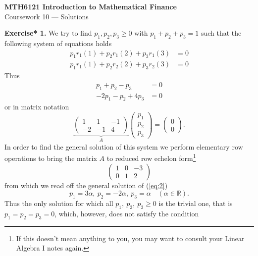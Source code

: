 \documentclass[11pt,a4paper]{article}
\begin{document}
    \begin{center}
        \LARGE\textbf{MTH6121 Introduction to Mathematical Finance}\\
        Coursework 10 — Solutions
    \end{center}
    \textbf{Exercise* 1.} We try to find $p_1, p_2, p_3 \geq 0$ with $p_1 + p_2 + p_3 = 1$ such that the following system of equations holds
    \begin{equation}\label{eq:1}
        \begin{aligned}
            p_1r_1(1) + p_2r_1(2) + p_3r_1(3) &= 0\\
            p_1r_1(1) + p_2r_2(2) + p_3r_2(3) &= 0
        \end{aligned}
    \end{equation}
    Thus
    \begin{align*}
        p_1 + p_2 - p_3 &= 0\\
        -2p_1 - p_2 + 4p_3 &= 0
    \end{align*}
    or in matrix notation
    \begin{equation}\label{eq:2}
        \underbrace{
            \begin{pmatrix}
                1 & 1 & -1\\
                -2 & -1 & 4
            \end{pmatrix}
        }_A
        \begin{pmatrix}
            p_1\\
            p_2\\
            p_3
        \end{pmatrix}
        =
        \begin{pmatrix}
            0\\0
        \end{pmatrix}.
    \end{equation}
    In order to find the general solution of this system we perform elementary row operations to bring the matrix $A$ to reduced row echelon form\footnote{If this doesn’t mean anything to you, you may want to consult your Linear Algebra I notes again.}
    $$
    \begin{pmatrix}
        1 & 0 & -3\\
        0 & 1 & 2
    \end{pmatrix}
    $$
    from which we read off the general solution of (\ref{eq:2})
    $$
    p_1 = 3\alpha,\ p_2 = -2\alpha,\ p_3 = \alpha \quad (\alpha \in \mathbb{R}).
    $$
    Thus the only solution for which all $p_1,\ p_2,\ p_3 \geq 0$ is the trivial one, that is $p_1 = p_2 = p_3 = 0$, which, however, does not satisfy the condition
\end{document}

